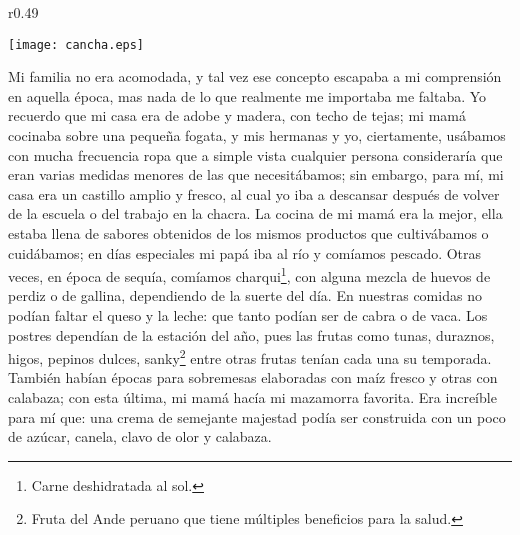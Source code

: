 \begin{wrapfigure}{r}{0.49\textwidth}
  \begin{center}
  \vspace{-20pt}
    \texttt{[image: cancha.eps]}
  \end{center}
  \vspace{-20pt}
\end{wrapfigure}
Mi familia no era acomodada, y tal vez ese concepto escapaba a mi comprensión en aquella época, mas nada de lo que realmente me importaba me faltaba.   
Yo recuerdo que mi casa era de adobe y madera, con techo de tejas; mi mamá cocinaba sobre una pequeña fogata, y mis hermanas y yo, ciertamente, usábamos con mucha frecuencia ropa que a simple vista cualquier persona consideraría que eran varias medidas menores de las que necesitábamos;
sin embargo, para mí, mi casa era un castillo amplio y fresco, al cual yo iba a descansar después de volver de la escuela o del trabajo en la chacra.
La cocina de mi mamá era la mejor, ella estaba llena de sabores obtenidos de los mismos productos que cultivábamos o cuidábamos; en días especiales mi papá iba al río y comíamos pescado. Otras veces, en época de sequía, comíamos charqui\footnote{Carne deshidratada al sol.}, con alguna mezcla de huevos de perdiz o de gallina, dependiendo de la suerte del día.
En nuestras comidas no podían faltar el queso y la leche: que tanto podían ser de cabra o de vaca.
Los postres dependían de la estación del año, pues las frutas como tunas, duraznos, higos, pepinos dulces, sanky\footnote{Fruta del Ande peruano que tiene múltiples beneficios para la salud.} entre otras frutas tenían cada una su temporada. También habían épocas para sobremesas elaboradas con maíz fresco y otras con calabaza; con esta última, mi mamá hacía mi mazamorra favorita. Era increíble para mí que: una crema de semejante majestad podía ser construida con un poco de azúcar, canela, clavo de olor y calabaza.

